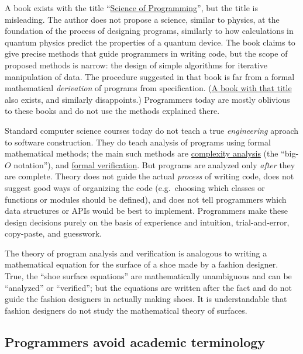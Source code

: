 A book exists with the title ``\href{https://www.amazon.com/Science-Programming-Monographs-Computer/dp/0387964800}{Science of Programming}'',
but the title is misleading. The author does not propose a science,
similar to physics, at the foundation of the process of designing
programs, similarly to how calculations in quantum physics predict
the properties of a quantum device. The book claims to give precise
methods that guide programmers in writing code, but the scope of proposed
methods is narrow: the design of simple algorithms for iterative manipulation
of data. The procedure suggested in that book is far from a formal
mathematical \emph{derivation} of programs from specification. (\href{https://www.amazon.com/Program-Derivation-Development-Specifications-International/dp/0201416247}{A book with that title}
also exists, and similarly disappoints.) Programmers today are mostly
oblivious to these books and do not use the methods explained there.

Standard computer science courses today do not teach a true \emph{engineering}
aproach to software construction. They do teach analysis of programs
using formal mathematical methods; the main such methods are \href{https://www.cs.cmu.edu/~adamchik/15-121/lectures/Algorithmic\%20Complexity/complexity.html}{complexity analysis}
(the ``big-$O$ notation''), and \href{https://en.wikipedia.org/wiki/Formal_verification}{formal verification}.
But programs are analyzed only \emph{after} they are complete. Theory
does not guide the actual \emph{process} of writing code, does not
suggest good ways of organizing the code (e.g.~choosing which classes
or functions or modules should be defined), and does not tell programmers
which data structures or APIs would be best to implement. Programmers
make these design decisions purely on the basis of experience and
intuition, trial-and-error, copy-paste, and guesswork. 

The theory of program analysis and verification is analogous to writing
a mathematical equation for the surface of a shoe made by a fashion
designer. True, the ``shoe surface equations'' are mathematically
unambiguous and can be ``analyzed'' or ``verified''; but the equations
are written after the fact and do not guide the fashion designers
in actually making shoes. It is understandable that fashion designers
do not study the mathematical theory of surfaces.

\subsection{Programmers avoid academic terminology }


